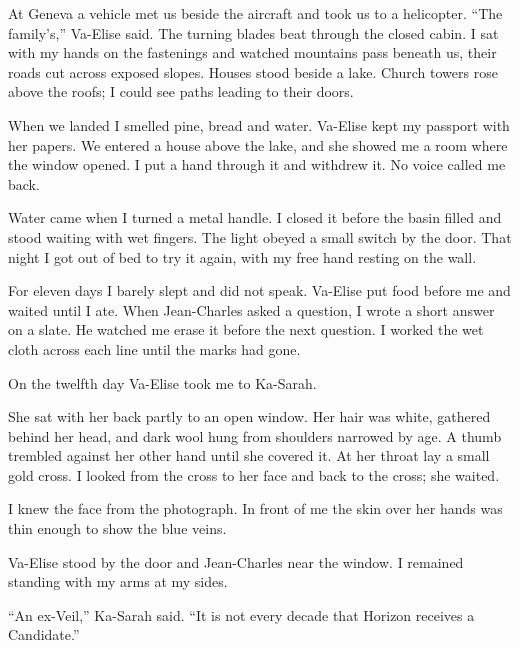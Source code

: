 At Geneva a vehicle met us beside the aircraft and took us to a helicopter. ``The family's,'' Va-Elise said. The turning blades beat through the closed cabin. I sat with my hands on the fastenings and watched mountains pass beneath us, their roads cut across exposed slopes. Houses stood beside a lake. Church towers rose above the roofs; I could see paths leading to their doors.\par

When we landed I smelled pine, bread and water. Va-Elise kept my passport with her papers. We entered a house above the lake, and she showed me a room where the window opened. I put a hand through it and withdrew it. No voice called me back.\par

Water came when I turned a metal handle. I closed it before the basin filled and stood waiting with wet fingers. The light obeyed a small switch by the door. That night I got out of bed to try it again, with my free hand resting on the wall.\par

For eleven days I barely slept and did not speak. Va-Elise put food before me and waited until I ate. When Jean-Charles asked a question, I wrote a short answer on a slate. He watched me erase it before the next question. I worked the wet cloth across each line until the marks had gone.\par

On the twelfth day Va-Elise took me to Ka-Sarah.\par

\ornament

She sat with her back partly to an open window. Her hair was white, gathered behind her head, and dark wool hung from shoulders narrowed by age. A thumb trembled against her other hand until she covered it. At her throat lay a small gold cross. I looked from the cross to her face and back to the cross; she waited.\par

I knew the face from the photograph. In front of me the skin over her hands was thin enough to show the blue veins.\par

Va-Elise stood by the door and Jean-Charles near the window. I remained standing with my arms at my sides.\par

``An ex-Veil,'' Ka-Sarah said. ``It is not every decade that Horizon receives a Candidate.''\par

